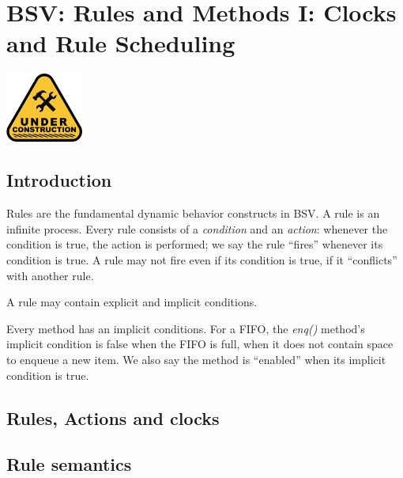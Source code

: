 

\chapter{BSV: Rules and Methods I: Clocks and Rule Scheduling}


\setcounter{page}{1}
\renewcommand{\thepage}{\arabic{chapter}-\arabic{page}}

\label{ch_Rules_I}


\vspace{2ex}

\centerline{\includegraphics[width=1in,angle=0]{Figures/Fig_Under_Construction}}

\vspace{2ex}

\section{Introduction}

Rules are the fundamental dynamic behavior constructs in BSV.  A rule
is an infinite process.  Every rule consists of a \emph{condition} and
an \emph{action}: whenever the condition is true, the action is
performed; we say the rule ``fires'' whenever its condition is true.
A rule may not fire even if its condition is true, if it ``conflicts''
with another rule.

A rule may contain explicit and implicit conditions. 

Every method has an implicit conditions.  For a FIFO, the \emph{enq()}
method's implicit condition is false when the FIFO is full, {\ie} when
it does not contain space to enqueue a new item.  We also say the
method is ``enabled'' when its implicit condition is true.

\section{Rules, Actions and clocks}

\section{Rule semantics}

